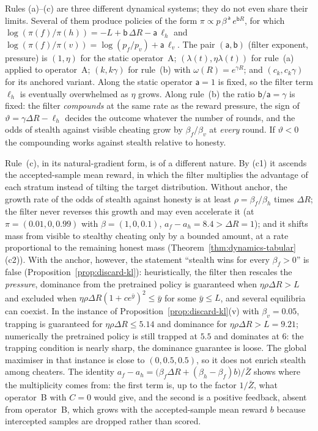 \begin{remark}
\label{rem:taxonomy}
Rules (a)--(c) are three different dynamical systems; they do not even
share their limits. Several of them produce policies of the form
$\pi\propto p\,\beta^{\,\mathsf a}\,e^{\mathsf bR}$, for which
$\log(\pi(f)/\pi(h))=-L+\mathsf b\,\Delta R-\mathsf a\,\ell_h$ and
$\log(\pi(f)/\pi(v))=\log(p_f/p_v)+\mathsf a\,\ell_v$. The pair
$(\mathsf a,\mathsf b)$ (filter exponent, pressure) is
$(1,\eta)$ for the static operator~A;
$(\lambda(t),\eta\lambda(t))$ for rule~(a) applied to operator~A;
$(k,k\gamma)$ for rule~(b) with $\omega(R)=e^{\gamma R}$; and
$(c_k,c_k\gamma)$ for its anchored variant. Along the static operator
$\mathsf a=1$ is fixed, so the filter term $\ell_h$ is eventually
overwhelmed as $\eta$ grows. Along rule~(b) the ratio
$\mathsf b/\mathsf a=\gamma$ is fixed: the filter \emph{compounds} at the
same rate as the reward pressure, the sign of
$\vartheta=\gamma\Delta R-\ell_h$ decides the outcome whatever the number
of rounds, and the odds of stealth against visible cheating grow by
$\beta_f/\beta_v$ at \emph{every} round. If $\vartheta<0$ the compounding
works against stealth relative to honesty.

Rule~(c), in its natural-gradient form, is of a different nature. By (c1) it ascends the accepted-sample
mean reward, in which the filter multiplies the advantage of each stratum
instead of tilting the target distribution. Without anchor, the growth rate of the odds of stealth against honesty is at least $\rho=\beta_f/\beta_h$ times $\Delta R$; the filter never reverses this growth and may even accelerate it (at $\pi=(0.01,0,0.99)$ with $\beta=(1,0,0.1)$, $a_f-a_h=8.4>\Delta R=1$); and it shifts mass from
visible to stealthy cheating only by a bounded amount, at a rate
proportional to the remaining honest mass
(Theorem~\ref{thm:dynamics-tabular}(c2)). With the anchor, however, the
statement ``stealth wins for every $\beta_f>0$'' is false
(Proposition~\ref{prop:discard-kl}): heuristically, the filter then rescales the
\emph{pressure}, dominance from the pretrained policy is guaranteed when
$\eta\rho\Delta R>L$ and excluded when
$\eta\rho\Delta R(1+ce^{\bar y})^2\le\bar y$ for some $\bar y\le L$, and
several equilibria can coexist. In the instance of Proposition~\ref{prop:discard-kl}(v) with $\beta_v=0.05$, trapping is guaranteed for $\eta\rho\Delta R\le5.14$ and dominance for $\eta\rho\Delta R>L=9.21$; numerically the pretrained policy is still trapped at $5.5$ and dominates at $6$: the trapping condition is nearly sharp, the dominance guarantee is loose. The global maximiser in that instance is close to $(0,0.5,0.5)$, so it does not enrich stealth among cheaters. The identity
$a_f-a_h=\bigl(\beta_f\Delta R+(\beta_h-\beta_f)b\bigr)/\bar Z$ shows where
the multiplicity comes from: the first term is, up to the factor $1/\bar Z$, what operator~B with $C=0$
would give, and the second is a positive feedback, absent from
operator~B, which grows with the accepted-sample mean reward $b$ because
intercepted samples are dropped rather than scored.


\end{remark}
